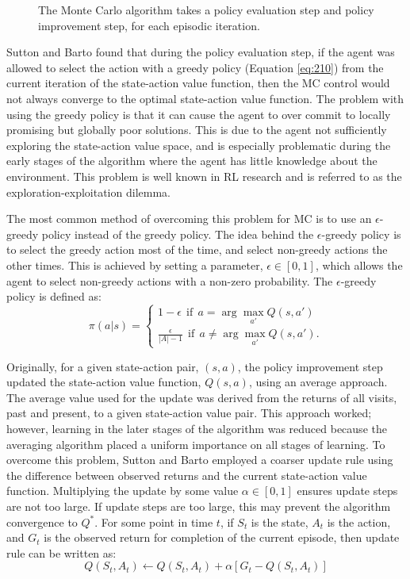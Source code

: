\begin{figure}[h]
	\centering
	
	\caption[Monte Carlo iterative approach]{The Monte Carlo algorithm takes a policy evaluation step and policy improvement step, for each episodic iteration.}
	\label{fig:210_monte_carlo_methods}
\end{figure}

Sutton and Barto found that during the policy evaluation step, if the agent was allowed to select the action with a greedy policy (Equation \ref{eq:210}) from the current iteration of the state-action value function, then the MC control would not always converge to the optimal state-action value function. The problem with using the greedy policy is that it can cause the agent to over commit to locally promising but globally poor solutions. This is due to the agent not sufficiently exploring the state-action value space, and is especially problematic during the early stages of the algorithm where the agent has little knowledge about the environment. This problem is well known in RL research and is referred to as the exploration-exploitation dilemma.

The most common method of overcoming this problem for MC is to use an $\epsilon$-greedy policy instead of the greedy policy. The idea behind the $\epsilon$-greedy policy is to select the greedy action most of the time, and select non-greedy actions the other times. This is achieved by setting a parameter, $\epsilon \in [0,1]$, which allows the agent to select non-greedy actions with a non-zero probability. The $\epsilon$-greedy policy is defined as:
\begin{equation}
   \pi (a | s) = %
   \begin{cases}
   		1 - \epsilon \ \ \text{if} \ \ a = \arg\max_{a'} Q(s,a') \\
   		\frac{\epsilon}{|A|-1} \ \ \text{if} \ \ a \neq \arg\max_{a'} Q(s,a').
   \end{cases} \label{eq:211}
\end{equation}

Originally, for a given state-action pair, $(s,a)$, the policy improvement step updated the state-action value function, $Q(s,a)$, using an average approach. The average value used for the update was derived from the returns of all visits, past and present, to a given state-action value pair. This approach worked; however, learning in the later stages of the algorithm was reduced because the averaging algorithm placed a uniform importance on all stages of learning. To overcome this problem, Sutton and Barto employed a coarser update rule using the difference between observed returns and the current state-action value function. Multiplying the update by some value $\alpha \in [0,1]$ ensures update steps are not too large. If update steps are too large, this may prevent the algorithm convergence to $Q^*$. For some point in time $t$, if $S_t$ is the state, $A_t$ is the action, and $G_t$ is the observed return for completion of the current episode, then update rule can be written as:
\begin{equation}
	Q(S_t, A_t) \gets Q(S_t, A_t) + \alpha[G_t - Q(S_t, A_t)] \label{eq:212}
\end{equation}

